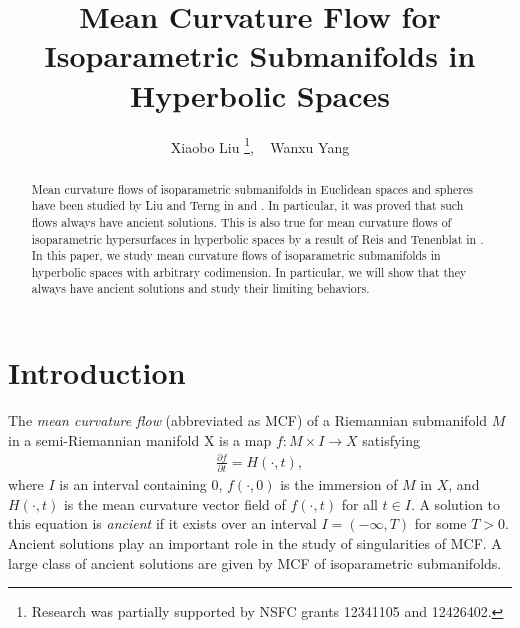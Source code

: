 \documentclass[12pt]{article}
\begin{document}
\title{\bf Mean Curvature Flow for Isoparametric Submanifolds in  Hyperbolic Spaces}
\author{Xiaobo Liu \thanks{Research was partially supported by NSFC grants 12341105 and 12426402.}, \,\,\,  Wanxu Yang }
\date{}

\maketitle


	
\begin{abstract}
   	Mean curvature flows of isoparametric submanifolds in Euclidean spaces and spheres have been studied by Liu and Terng in \cite{X.CT} and \cite{X.C}. In particular, it was proved that such flows always have ancient solutions. This is also true for mean curvature flows of isoparametric hypersurfaces in hyperbolic spaces by a result of Reis and Tenenblat in \cite{S.H.T}. In this paper, we study mean curvature flows of isoparametric submanifolds in  hyperbolic spaces with arbitrary codimension.  In particular, we will show that they always have ancient solutions and study their limiting behaviors.
\end{abstract}




\section{Introduction}


The {\it mean curvature flow} (abbreviated as MCF) of a Riemannian submanifold $M$ in a semi-Riemannian manifold X is a map
$f: M\times I \rightarrow X$ satisfying
  \begin{align}
  	\frac{\partial f}{\partial t}= H(\cdot,t), \label{1.16}
  \end{align}
where $I$ is an interval containing $0$, $f(\cdot, 0)$ is the immersion of $M$ in $X$, and $H(\cdot,t)$ is the mean curvature vector field of $f(\cdot,t)$ for all $t \in I$.
A solution to this equation is {\it ancient} if it exists over an interval $I = (-\infty, T)$ for some $T > 0$.
Ancient solutions play an important role in the study of singularities of MCF. A large class of ancient solutions
are given by MCF of isoparametric submanifolds.
\end{document}
